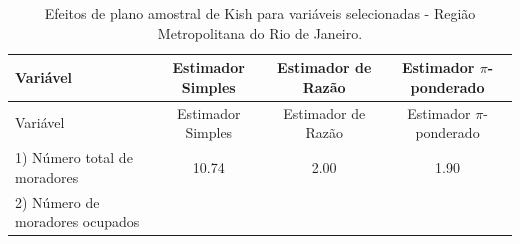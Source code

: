 \documentclass[]{book}
\theoremstyle{definition}
\theoremstyle{definition}
\theoremstyle{definition}
\theoremstyle{remark}
\begin{document}
\begin{longtable}[]{@{}lccc@{}}
\caption{\label{tab:epakish} Efeitos de plano amostral de Kish para
variáveis selecionadas - Região Metropolitana do Rio de
Janeiro.}\tabularnewline
\toprule
\begin{minipage}[b]{0.24\columnwidth}\raggedright\strut
Variável\strut
\end{minipage} & \begin{minipage}[b]{0.19\columnwidth}\centering\strut
Estimador Simples\strut
\end{minipage} & \begin{minipage}[b]{0.20\columnwidth}\centering\strut
Estimador de Razão\strut
\end{minipage} & \begin{minipage}[b]{0.26\columnwidth}\centering\strut
Estimador \(\pi\)-ponderado\strut
\end{minipage}\tabularnewline
\midrule
\endfirsthead
\toprule
\begin{minipage}[b]{0.24\columnwidth}\raggedright\strut
Variável\strut
\end{minipage} & \begin{minipage}[b]{0.19\columnwidth}\centering\strut
Estimador Simples\strut
\end{minipage} & \begin{minipage}[b]{0.20\columnwidth}\centering\strut
Estimador de Razão\strut
\end{minipage} & \begin{minipage}[b]{0.26\columnwidth}\centering\strut
Estimador \(\pi\)-ponderado\strut
\end{minipage}\tabularnewline
\midrule
\endhead
\begin{minipage}[t]{0.24\columnwidth}\raggedright\strut
1) Número total de moradores\strut
\end{minipage} & \begin{minipage}[t]{0.19\columnwidth}\centering\strut
10.74\strut
\end{minipage} & \begin{minipage}[t]{0.20\columnwidth}\centering\strut
2.00\strut
\end{minipage} & \begin{minipage}[t]{0.26\columnwidth}\centering\strut
1.90\strut
\end{minipage}\tabularnewline
\begin{minipage}[t]{0.24\columnwidth}\raggedright\strut
2) Número de moradores ocupados\strut
\end{minipage} & \begin{minipage}[t]{0.19\columnwidth}\centering\strut

\end{minipage}
\end{longtable}
\end{document}
